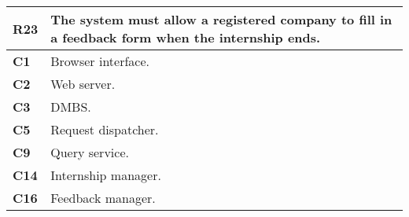 \begin{table}[H]
    \centering
    \begin{tabular}{|l|m{10cm}|}
        \hline \textbf{R23} & The system must allow a registered company to fill in a feedback form when the internship ends.\\
        \hline \textbf{C1} & Browser interface. \\
        \hline \textbf{C2} & Web server. \\
        \hline \textbf{C3} & DMBS. \\
        \hline \textbf{C5} & Request dispatcher. \\
        \hline \textbf{C9} & Query service. \\
        \hline \textbf{C14} & Internship manager. \\
        \hline \textbf{C16} & Feedback manager. \\
        \hline
    \end{tabular}
\end{table}

